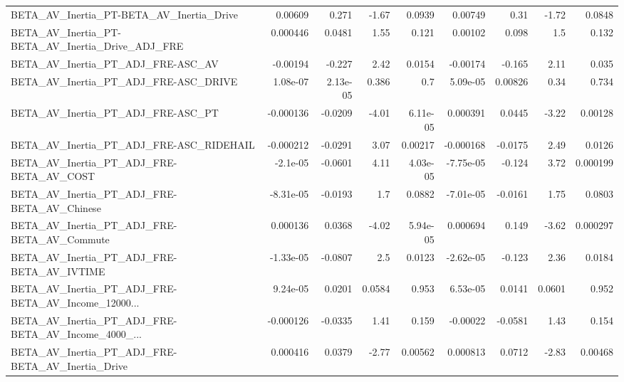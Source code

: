 \begin{tabular}{lrrrrrrrr}
BETA\_AV\_Inertia\_PT-BETA\_AV\_Inertia\_Drive           &     0.00609 &        0.271 &    -1.67 &   0.0939 &    0.00749 &        0.31 &        -1.72 &        0.0848 \\
BETA\_AV\_Inertia\_PT-BETA\_AV\_Inertia\_Drive\_ADJ\_FRE   &    0.000446 &       0.0481 &     1.55 &    0.121 &    0.00102 &       0.098 &          1.5 &         0.132 \\
BETA\_AV\_Inertia\_PT\_ADJ\_FRE-ASC\_AV                  &    -0.00194 &       -0.227 &     2.42 &   0.0154 &   -0.00174 &      -0.165 &         2.11 &         0.035 \\
BETA\_AV\_Inertia\_PT\_ADJ\_FRE-ASC\_DRIVE               &    1.08e-07 &     2.13e-05 &    0.386 &      0.7 &   5.09e-05 &     0.00826 &         0.34 &         0.734 \\
BETA\_AV\_Inertia\_PT\_ADJ\_FRE-ASC\_PT                  &   -0.000136 &      -0.0209 &    -4.01 & 6.11e-05 &   0.000391 &      0.0445 &        -3.22 &       0.00128 \\
BETA\_AV\_Inertia\_PT\_ADJ\_FRE-ASC\_RIDEHAIL            &   -0.000212 &      -0.0291 &     3.07 &  0.00217 &  -0.000168 &     -0.0175 &         2.49 &        0.0126 \\
BETA\_AV\_Inertia\_PT\_ADJ\_FRE-BETA\_AV\_COST            &    -2.1e-05 &      -0.0601 &     4.11 & 4.03e-05 &  -7.75e-05 &      -0.124 &         3.72 &      0.000199 \\
BETA\_AV\_Inertia\_PT\_ADJ\_FRE-BETA\_AV\_Chinese         &   -8.31e-05 &      -0.0193 &      1.7 &   0.0882 &  -7.01e-05 &     -0.0161 &         1.75 &        0.0803 \\
BETA\_AV\_Inertia\_PT\_ADJ\_FRE-BETA\_AV\_Commute         &    0.000136 &       0.0368 &    -4.02 & 5.94e-05 &   0.000694 &       0.149 &        -3.62 &      0.000297 \\
BETA\_AV\_Inertia\_PT\_ADJ\_FRE-BETA\_AV\_IVTIME          &   -1.33e-05 &      -0.0807 &      2.5 &   0.0123 &  -2.62e-05 &      -0.123 &         2.36 &        0.0184 \\
BETA\_AV\_Inertia\_PT\_ADJ\_FRE-BETA\_AV\_Income\_12000... &    9.24e-05 &       0.0201 &   0.0584 &    0.953 &   6.53e-05 &      0.0141 &       0.0601 &         0.952 \\
BETA\_AV\_Inertia\_PT\_ADJ\_FRE-BETA\_AV\_Income\_4000\_... &   -0.000126 &      -0.0335 &     1.41 &    0.159 &   -0.00022 &     -0.0581 &         1.43 &         0.154 \\
BETA\_AV\_Inertia\_PT\_ADJ\_FRE-BETA\_AV\_Inertia\_Drive   &    0.000416 &       0.0379 &    -2.77 &  0.00562 &   0.000813 &      0.0712 &        -2.83 &       0.00468 \\

\end{tabular}
